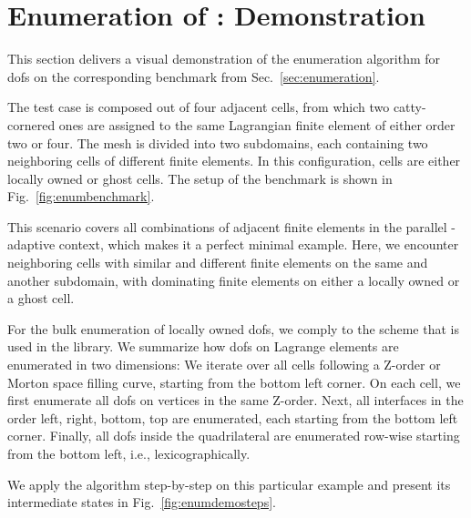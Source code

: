 \chapter{Enumeration of : Demonstration}
\label{app::enumeration}
\glsresetall

This section delivers a visual demonstration of the enumeration algorithm for \glspl{dof} on the corresponding benchmark from Sec.~\ref{sec:enumeration}.

The test case is composed out of four adjacent cells, from which two catty-cornered ones are assigned to the same Lagrangian finite element of either order two or four. The mesh is divided into two subdomains, each containing two neighboring cells of different finite elements. In this configuration, cells are either locally owned or ghost cells. The setup of the benchmark is shown in Fig.~\ref{fig:enumbenchmark}. %

This scenario covers all combinations of adjacent finite elements in the parallel \hp-adaptive context, which makes it a perfect minimal example. Here, we encounter neighboring cells with similar and different finite elements on the same and another subdomain, with dominating finite elements on either a locally owned or a ghost cell.

For the bulk enumeration of locally owned \glspl{dof}, we comply to the scheme that is used in the \dealii{} library. We summarize how \glspl{dof} on Lagrange elements are enumerated in two dimensions: We iterate over all cells following a Z-order or Morton space filling curve, starting from the bottom left corner. On each cell, we first enumerate all \glspl{dof} on vertices in the same Z-order. Next, all interfaces in the order left, right, bottom, top are enumerated, each starting from the bottom left corner. Finally, all \glspl{dof} inside the quadrilateral are enumerated row-wise starting from the bottom left, i.e., lexicographically. \textcite{dealiifeq}

We apply the algorithm step-by-step on this particular example and present its intermediate states in Fig.~\ref{fig:enumdemosteps}.

